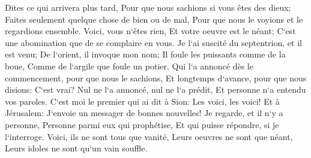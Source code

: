 \verse Dites ce qui arrivera plus tard, Pour que nous sachions si vous êtes des dieux; Faites seulement quelque chose de bien ou de mal, Pour que nous le voyions et le regardions ensemble. 
\verse Voici, vous n`êtes rien, Et votre oeuvre est le néant; C`est une abomination que de se complaire en vous. 
\verse Je l`ai suscité du septentrion, et il est venu; De l`orient, il invoque mon nom; Il foule les puissants comme de la boue, Comme de l`argile que foule un potier. 
\verse Qui l`a annoncé dès le commencement, pour que nous le sachions, Et longtemps d`avance, pour que nous disions: C`est vrai? Nul ne l`a annoncé, nul ne l`a prédit, Et personne n`a entendu vos paroles. 
\verse C`est moi le premier qui ai dit à Sion: Les voici, les voici! Et à Jérusalem: J`envoie un messager de bonnes nouvelles! 
\verse Je regarde, et il n`y a personne, Personne parmi eux qui prophétise, Et qui puisse répondre, si je l`interroge. 
\verse Voici, ils ne sont tous que vanité, Leurs oeuvres ne sont que néant, Leurs idoles ne sont qu`un vain souffle. 

